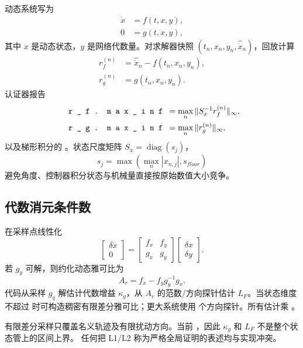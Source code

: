 动态系统写为
\begin{align}
 \dot x&=f(t,x,y),\\
 0&=g(t,x,y),
\end{align}
其中 $x$ 是动态状态，$y$ 是网络代数量。对求解器快照
$(t_n,x_n,y_n,\widehat{\dot x}_n)$，回放计算
\begin{align}
 r_f^{(n)}&=\widehat{\dot x}_n-f(t_n,x_n,y_n),\\
 r_g^{(n)}&=g(t_n,x_n,y_n).
\end{align}
认证器报告
\begin{align}
 \fld{r\_f.max\_inf}&=\max_n\|S_x^{-1}r_f^{(n)}\|_\infty,\\
 \fld{r\_g.max\_inf}&=\max_n\|r_g^{(n)}\|_\infty,
\end{align}
以及梯形积分的 。状态尺度矩阵
$S_x=\operatorname{diag}(s_j)$，
\begin{equation}
 s_j=\max\left(\max_n|x_{n,j}|,s_{floor}\right)
\end{equation}
避免角度、控制器积分状态与机械量直接按原始数值大小竞争。

\subsection{代数消元条件数}

在采样点线性化
\begin{equation}
 \begin{bmatrix}\delta\dot x\\0\end{bmatrix}=
 \begin{bmatrix}f_x&f_y\\g_x&g_y\end{bmatrix}
 \begin{bmatrix}\delta x\\\delta y\end{bmatrix}.
\end{equation}
若 $g_y$ 可解，则约化动态雅可比为
\begin{equation}
 A_r=f_x-f_yg_y^{-1}g_x.
\end{equation}
代码从采样 $g_y$ 解估计代数增益 $\kappa_g$，从 $A_r$ 的范数/方向探针估计 $L_F$。当状态维度
不超过  时可构造稠密有限差分雅可比；更大系统使用
 个方向探针。所有估计乘
。

\begin{gapnote}
有限差分采样只覆盖名义轨迹及有限扰动方向。当前
，因此 $\kappa_g$ 和 $L_F$ 不是整个状态管上的区间上界。
任何把 L1/L2 称为严格全局证明的表述均与实现冲突。
\end{gapnote}

